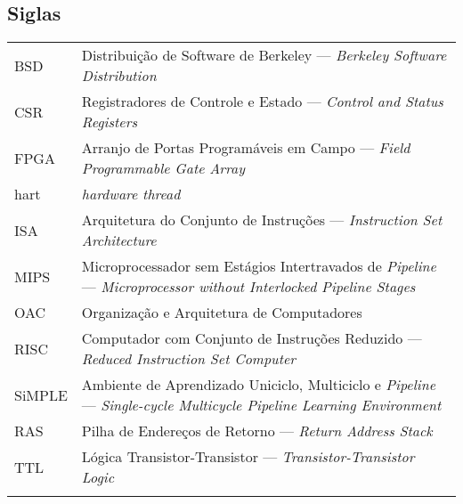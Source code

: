 


\subsection*{Siglas}

\begin{tabular}{p{}p{}}
    {BSD} & {Distribuição de Software de Berkeley --- \textit{Berkeley Software Distribution}}\tabularnewline{}
    {CSR} & {Registradores de Controle e Estado --- \textit{Control and Status Registers}} \tabularnewline{}
    {FPGA} & {Arranjo de Portas Programáveis em Campo --- \textit{Field Programmable Gate Array}} \tabularnewline{}
    {hart} & {\textit{hardware thread}} \tabularnewline{}
    {ISA} & {Arquitetura do Conjunto de Instruções --- \textit{Instruction Set Architecture}} \tabularnewline{}
    {MIPS} & {Microprocessador sem Estágios Intertravados de \textit{Pipeline} --- \textit{Microprocessor without Interlocked Pipeline Stages}} \tabularnewline{}
    {OAC} & {Organização e Arquitetura de Computadores} \tabularnewline{}
    {RISC} & {Computador com Conjunto de Instruções Reduzido --- \textit{Reduced Instruction Set Computer}} \tabularnewline{}
    {SiMPLE} & {Ambiente de Aprendizado Uniciclo, Multiciclo e \textit{Pipeline} --- \textit{Single-cycle Multicycle Pipeline Learning Environment}} \tabularnewline{}
    {RAS} & {Pilha de Endereços de Retorno --- \textit{Return Address Stack}} \tabularnewline{}
    {TTL} & {Lógica Transistor-Transistor --- \textit{Transistor-Transistor Logic}} \tabularnewline{}
\end{tabular}
